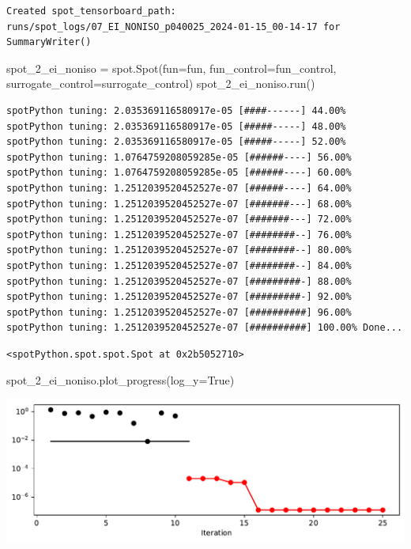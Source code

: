 \documentclass[
  letterpaper,
  DIV=11,
  numbers=noendperiod]{scrreprt}
\newenvironment{Shaded}{\begin{snugshade}}{\end{snugshade}}
\newcommand{\NormalTok}[1]{\textcolor[rgb]{0.00,0.23,0.31}{#1}}
\newcommand{\OperatorTok}[1]{\textcolor[rgb]{0.37,0.37,0.37}{#1}}
\newcommand{\VariableTok}[1]{\textcolor[rgb]{0.07,0.07,0.07}{#1}}
\begin{document}
\begin{verbatim}
Created spot_tensorboard_path: runs/spot_logs/07_EI_NONISO_p040025_2024-01-15_00-14-17 for SummaryWriter()
\end{verbatim}

\begin{Shaded}
\begin{Highlighting}[]
\NormalTok{spot\_2\_ei\_noniso }\OperatorTok{=}\NormalTok{ spot.Spot(fun}\OperatorTok{=}\NormalTok{fun,}
\NormalTok{                   fun\_control}\OperatorTok{=}\NormalTok{fun\_control,}
\NormalTok{                   surrogate\_control}\OperatorTok{=}\NormalTok{surrogate\_control)}
\NormalTok{spot\_2\_ei\_noniso.run()}
\end{Highlighting}
\end{Shaded}

\begin{verbatim}
spotPython tuning: 2.035369116580917e-05 [####------] 44.00% 
spotPython tuning: 2.035369116580917e-05 [#####-----] 48.00% 
spotPython tuning: 2.035369116580917e-05 [#####-----] 52.00% 
spotPython tuning: 1.0764759208059285e-05 [######----] 56.00% 
spotPython tuning: 1.0764759208059285e-05 [######----] 60.00% 
spotPython tuning: 1.2512039520452527e-07 [######----] 64.00% 
spotPython tuning: 1.2512039520452527e-07 [#######---] 68.00% 
spotPython tuning: 1.2512039520452527e-07 [#######---] 72.00% 
spotPython tuning: 1.2512039520452527e-07 [########--] 76.00% 
spotPython tuning: 1.2512039520452527e-07 [########--] 80.00% 
spotPython tuning: 1.2512039520452527e-07 [########--] 84.00% 
spotPython tuning: 1.2512039520452527e-07 [#########-] 88.00% 
spotPython tuning: 1.2512039520452527e-07 [#########-] 92.00% 
spotPython tuning: 1.2512039520452527e-07 [##########] 96.00% 
spotPython tuning: 1.2512039520452527e-07 [##########] 100.00% Done...
\end{verbatim}

\begin{verbatim}
<spotPython.spot.spot.Spot at 0x2b5052710>
\end{verbatim}

\begin{Shaded}
\begin{Highlighting}[]
\NormalTok{spot\_2\_ei\_noniso.plot\_progress(log\_y}\OperatorTok{=}\VariableTok{True}\NormalTok{)}
\end{Highlighting}
\end{Shaded}

\includegraphics{012_num_spot_ei_files/figure-pdf/cell-14-output-1.pdf}
\end{document}
